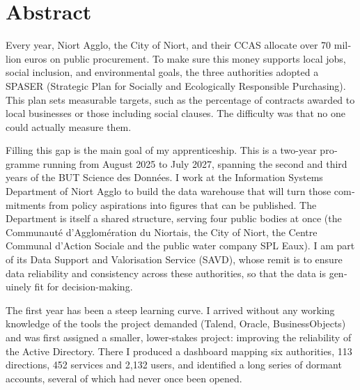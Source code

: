 \documentclass[11pt,a4paper]{article}
\begin{document}
\section*{Abstract}
\begin{english}
Every year, Niort Agglo, the City of Niort, and their CCAS allocate over 70 million euros on public procurement. To make sure this money supports local jobs, social inclusion, and environmental goals, the three authorities adopted a SPASER (Strategic Plan for Socially and Ecologically Responsible Purchasing). This plan sets measurable targets, such as the percentage of contracts awarded to local businesses or those including social clauses. The difficulty was that no one could actually measure them.

Filling this gap is the main goal of my apprenticeship. This is a two-year programme running from August 2025 to July 2027, spanning the second and third years of the BUT Science des Données. I work at the Information Systems Department of Niort Agglo to build the data warehouse that will turn those commitments from policy aspirations into figures that can be published. The Department is itself a shared structure, serving four public bodies at once (the Communauté d'Agglomération du Niortais, the City of Niort, the Centre Communal d'Action Sociale and the public water company SPL Eaux). I am part of its Data Support and Valorisation Service (SAVD), whose remit is to ensure data reliability and consistency across these authorities, so that the data is genuinely fit for decision-making.

The first year has been a steep learning curve. I arrived without any working knowledge of the tools the project demanded (Talend, Oracle, BusinessObjects) and was first assigned a smaller, lower-stakes project: improving the reliability of the Active Directory. There I produced a dashboard mapping six authorities, 113 directions, 452 services and 2,132 users, and identified a long series of dormant accounts, several of which had never once been opened.


\end{english}
\end{document}
